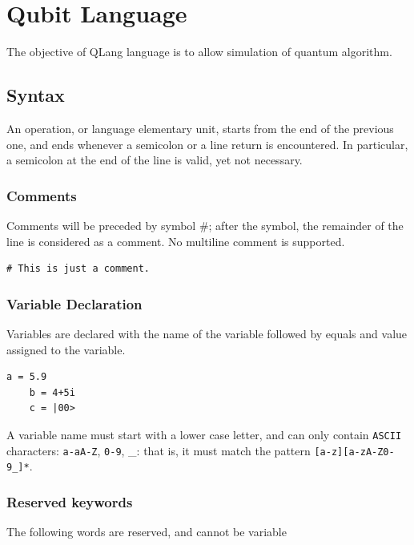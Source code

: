 \documentclass[11pt]{article}
\newcommand{\QL}{\textsf{QLang}\xspace}
\begin{document}
\section {Qubit Language}
	
	The objective of \QL language is to allow simulation of quantum algorithm.
		
\subsection{Syntax}

An operation, or language elementary unit, starts from the end of the previous one, and ends whenever a semicolon or a line return is encountered. In particular, a semicolon at the end of the line is valid, yet not necessary.

\subsubsection{Comments}
Comments will be preceded by symbol \#; after the symbol, the remainder of the line is considered as a comment. No multiline comment is supported.
\begin{lstlisting}[frame=single]
	# This is just a comment.
\end{lstlisting}
	
\subsubsection {Variable Declaration}
Variables are declared with the name of the variable followed by equals and value assigned to the variable.

\begin{lstlisting}[frame=single]
	a = 5.9  
	b = 4+5i
	c = |00>
\end{lstlisting}

A variable name must start with a lower case letter, and can only contain \texttt{ASCII} characters: \texttt{a-aA-Z}, \texttt{0-9}, \_: that is, it must match the pattern \texttt{[a-z][a-zA-Z0-9\_]*}.

\subsubsection{Reserved keywords}
The following words are reserved, and cannot be variable 
\end{document}
